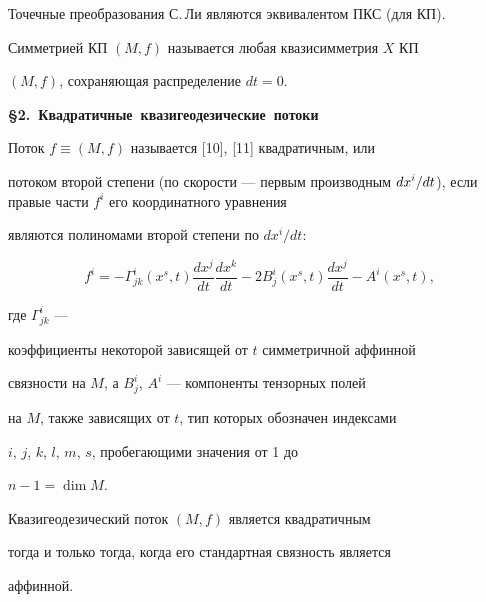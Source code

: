 Точечные преобразования С.\,Ли являются эквивалентом ПКС (для КП).





\begin{defn}


Симметрией КП $(M,f) $ называется любая квазисимметрия $X$ КП


$(M,f)$, сохраняющая распределение $dt=0$.


\end{defn}


\medskip





\centerline{\bf \S 2.~Квадратичные~квазигеодезические~потоки}


\medskip





Поток $f\equiv(M,f) $ называется [10], [11] квадратичным, или


потоком второй степени (по скорости --- первым производным $\dst


dx^i/dt$), если правые части $f^i$ его координатного уравнения


являются полиномами второй степени по $dx^i/dt$:


$$


f^i=-\Gamma^i_{jk}(x^s,t)\frac{dx^j}{dt}\frac{dx^k}{dt}-2B^i_j(x^s,t)


\frac{dx^j}{dt}-A^i(x^s,t),


$$


где $\Gamma^i_{jk}$ ---


коэффициенты некоторой зависящей от $t$ симметричной аффинной


связности на $M$, а $B^i_j$, $A^i$ --- компоненты тензорных полей


на $M$, также зависящих от $t$, тип которых обозначен индексами


$i$, $j$, $k$, $l$, $m$, $s$, пробегающими значения от 1 до


$n-1=\dim M$.





\begin{thm}


Квазигеодезический поток $(M,f) $ является квадратичным


тогда и только тогда, когда его стандартная связность является


аффинной.


\end{thm}






